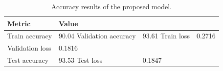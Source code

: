 \begin{table}
\caption{Accuracy results of the proposed model.}
\label{tab:accuracy_results}
\begin{tabular}{ll}
\toprule
Metric & Value \\
\midrule
Train accuracy & 90.04%
Validation accuracy & 93.61%
Train loss & 0.2716 \\
Validation loss & 0.1816 \\
Test accuracy & 93.53%
Test loss & 0.1847 \\
\bottomrule
\end{tabular}
\end{table}
